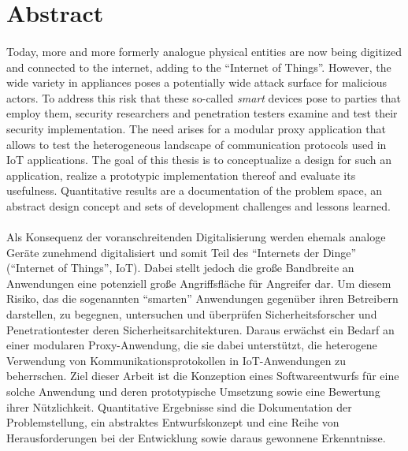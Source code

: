 \chapter*{Abstract}
\subsubsection*{\hsmatitelen}
Today, more and more formerly analogue physical entities are now being digitized and connected to the internet, adding to the \enquote{Internet of Things}. However, the wide variety in appliances poses a potentially wide attack surface for malicious actors. To address this risk that these so-called \emph{smart} devices pose to parties that employ them, security researchers and penetration testers examine and test their security implementation. The need arises for a modular proxy application that allows to test the heterogeneous landscape of communication protocols used in IoT applications. The goal of this thesis is to conceptualize a design for such an application, realize a prototypic implementation thereof and evaluate its usefulness. Quantitative results are a documentation of the problem space, an abstract design concept and sets of development challenges and lessons learned. 

\subsubsection*{\hsmatitelde}
Als Konsequenz der voranschreitenden Digitalisierung werden ehemals analoge Geräte zunehmend digitalisiert und somit Teil des \enquote{Internets der Dinge} (\enquote{Internet of Things}, IoT). Dabei stellt jedoch die große Bandbreite an Anwendungen eine potenziell große Angriffsfläche für Angreifer dar. Um diesem Risiko, das die sogenannten \enquote{smarten} Anwendungen gegenüber ihren Betreibern darstellen, zu begegnen, untersuchen und überprüfen Sicherheitsforscher und Penetrationtester deren Sicherheitsarchitekturen. Daraus erwächst ein Bedarf an einer modularen Proxy-Anwendung, die sie dabei unterstützt, die heterogene Verwendung von Kommunikationsprotokollen in IoT-Anwendungen zu beherrschen. Ziel dieser Arbeit ist die Konzeption eines Softwareentwurfs für eine solche Anwendung und deren prototypische Umsetzung sowie eine Bewertung ihrer Nützlichkeit. Quantitative Ergebnisse sind die Dokumentation der Problemstellung, ein abstraktes Entwurfskonzept und eine Reihe von Herausforderungen bei der Entwicklung sowie daraus gewonnene Erkenntnisse.